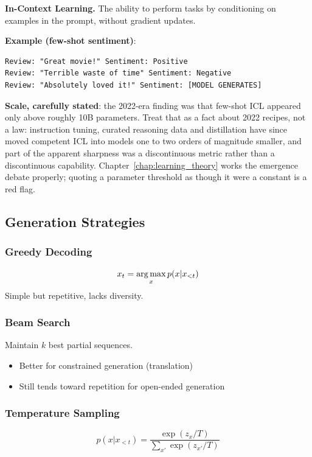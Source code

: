\textbf{In-Context Learning.} The ability to perform tasks by conditioning on examples in the prompt, without gradient updates.

\textbf{Example (few-shot sentiment)}:
\begin{verbatim}
Review: "Great movie!" Sentiment: Positive
Review: "Terrible waste of time" Sentiment: Negative
Review: "Absolutely loved it!" Sentiment: [MODEL GENERATES]
\end{verbatim}

\textbf{Scale, carefully stated}: the 2022-era finding was that few-shot ICL appeared only above roughly 10B parameters. Treat that as a fact about 2022 recipes, not a law: instruction tuning, curated reasoning data and distillation have since moved competent ICL into models one to two orders of magnitude smaller, and part of the apparent sharpness was a discontinuous metric rather than a discontinuous capability. Chapter~\ref{chap:learning_theory} works the emergence debate properly; quoting a parameter threshold as though it were a constant is a red flag.

\subsection{Generation Strategies}

\subsubsection{Greedy Decoding}
\begin{equation}
x_t = \operatorname*{arg\,max}_x p(x | x_{<t})
\end{equation}
Simple but repetitive, lacks diversity.

\subsubsection{Beam Search}
Maintain $k$ best partial sequences.
\begin{itemize}
    \item Better for constrained generation (translation)
    \item Still tends toward repetition for open-ended generation
\end{itemize}

\subsubsection{Temperature Sampling}
\begin{equation}
p(x | x_{<t}) = \frac{\exp(z_x / T)}{\sum_{x'} \exp(z_{x'} / T)}
\end{equation}

